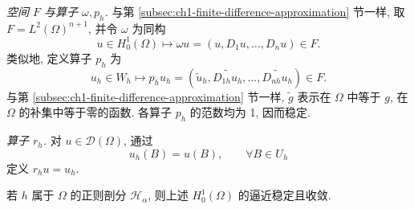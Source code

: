 \emph{空间 $F$ 与算子 $\omega,p_h$.} 与第 \ref{subsec:ch1-finite-difference-approximation} 节一样, 取 $F=L^2(\Omega)^{n+1}$, 并令 $\omega$ 为同构
\begin{equation}
u\in H_0^1(\Omega)\longmapsto
\omega u=(u,D_1u,\ldots,D_nu)\in F.
\label{eq:ch1-nc-h01-embedding}
\end{equation}
类似地, 定义算子 $p_h$ 为
\begin{equation}
u_h\in W_h\longmapsto
p_hu_h=(\widetilde u_h,\widetilde{D_{1h}u_h},\ldots,
\widetilde{D_{nh}u_h})\in F.
\label{eq:ch1-nc-prolongation}
\end{equation}
与第 \ref{subsec:ch1-finite-difference-approximation} 节一样, $\widetilde g$ 表示在 $\Omega$ 中等于 $g$, 在 $\Omega$ 的补集中等于零的函数. 各算子 $p_h$ 的范数均为 1, 因而稳定.

\emph{算子 $r_h$.} 对 $u\in\mathcal D(\Omega)$, 通过
\begin{equation}
u_h(B)=u(B),
\qquad\forall B\in U_h
\label{eq:ch1-nc-point-restriction}
\end{equation}
定义 $r_hu=u_h$.

\begin{Proposition}
\label{prop:ch1-nc-h01-stable-convergent}
若 $h$ 属于 $\Omega$ 的正则剖分 $\mathcal H_\alpha$, 则上述 $H_0^1(\Omega)$ 的逼近稳定且收敛.
\end{Proposition}

